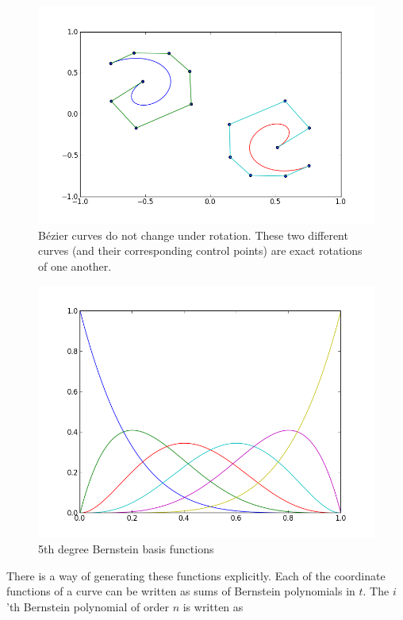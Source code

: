 \begin{figure}
\includegraphics[width=\textwidth]{bezier_rotation}
\caption{B\'{e}zier curves do not change under rotation.
These two different curves (and their corresponding control points) are exact rotations of one another.}
\end{figure}

\begin{figure}
\includegraphics[width=\textwidth]{bernstein_basis}
\caption{5th degree Bernstein basis functions}
\end{figure}

There is a way of generating these functions explicitly.
Each of the coordinate functions of a curve can be written as sums of Bernstein polynomials in $t$.
The $i$'th Bernstein polynomial of order $n$ is written as

